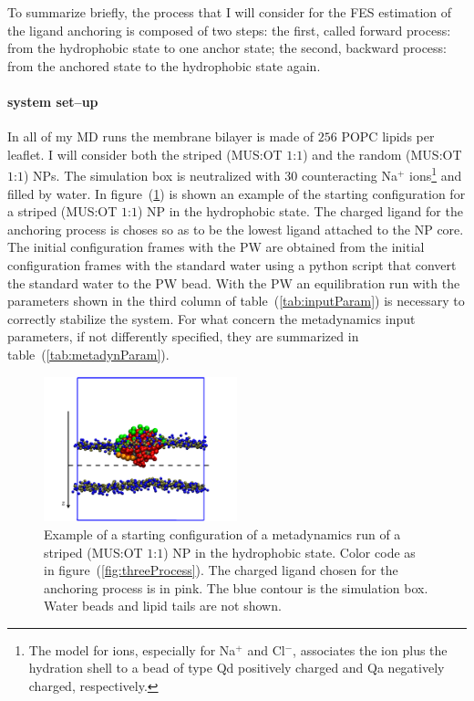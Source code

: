 To summarize briefly, the process that I will consider for the \ac{FES} estimation of the ligand anchoring is composed of two steps: the first, called forward process: from the hydrophobic state to one anchor state; the second, backward process: from the anchored state to the hydrophobic state again. 

\paragraph{\textbf{system set--up}} In all of my \ac{MD} runs the membrane bilayer is made of $256$ \ac{POPC} lipids per leaflet. I will consider both the striped (\ac{MUS}:\ac{OT} $1$:$1$) and the random (\ac{MUS}:\ac{OT} $1$:$1$) \acp{NP}. The simulation box is neutralized with $30$ counteracting Na$^+$ ions\footnote{The \martini model for ions, especially for Na$^+$ and Cl$^-$, associates the ion plus the hydration shell to a bead of type Qd positively charged and Qa negatively charged, respectively.} and filled by water. In figure~(\ref{fig:startFrameEx}) is shown an example of the starting configuration for a striped (\ac{MUS}:\ac{OT} $1$:$1$) \ac{NP} in the hydrophobic state. The charged ligand for the anchoring process is choses so as to be the lowest ligand attached to the \ac{NP} core. The initial configuration frames with the \ac{PW} are obtained from the initial configuration frames with the standard \martini water using a python script that convert the standard \martini water to the \ac{PW} bead. With the \ac{PW} an equilibration run with the parameters shown in the third column of table~(\ref{tab:inputParam}) is necessary to correctly stabilize the system. For what concern the metadynamics input parameters, if not differently specified, they are summarized in table~(\ref{tab:metadynParam}).
\begin{figure}
	\centering
	\includegraphics[width=0.5\textwidth]{./img/patchedHydrophobic}
	\caption{Example of a starting configuration of a metadynamics run of a striped (\ac{MUS}:\ac{OT} $1$:$1$) \ac{NP} in the hydrophobic state. Color code as in figure~(\ref{fig:threeProcess}). The charged ligand chosen for the anchoring process is in pink. The blue contour is the simulation box. Water beads and lipid tails are not shown.}
	\label{fig:startFrameEx}
\end{figure}

